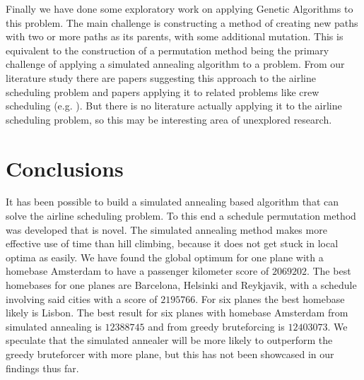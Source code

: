 \documentclass[journal]{IEEEtran}
\begin{document}
Finally we have done some exploratory work on applying Genetic Algorithms to this problem. The main challenge is constructing a method of creating new paths with two or more paths as its parents, with some additional mutation. This is equivalent to the construction of a permutation method being the primary challenge of applying a simulated annealing algorithm to a problem. From our literature study there are papers suggesting this approach to the airline scheduling problem and papers applying it to related problems like crew scheduling  (e.g. \cite{Levine1996}). But there is no literature actually applying it to the airline scheduling problem, so this may be interesting area of unexplored research.




\section{Conclusions}
It has been possible to build a simulated annealing based algorithm that can solve the airline scheduling problem. To this end a schedule permutation method was developed that is novel. The simulated annealing method makes more effective use of time than hill climbing, because it does not get stuck in local optima as easily. We have found the global optimum for one plane with a homebase Amsterdam to have a passenger kilometer score of $\num{2069202}$. The best homebases for one planes are Barcelona, Helsinki and Reykjavik, with a schedule involving said cities with a score of $\num{2195766}$. For six planes the best homebase likely is Lisbon. The best result for six planes with homebase Amsterdam from simulated annealing is $\num{12388745}$ and from greedy bruteforcing is $\num{12403073}$. We speculate that the simulated annealer will be more likely to outperform the greedy bruteforcer with more plane, but this has not been showcased in our findings thus far.


\end{document}

